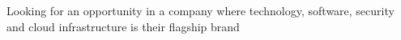 \par{
Looking for an opportunity in a company where technology, software, security and cloud infrastructure is their flagship brand
}